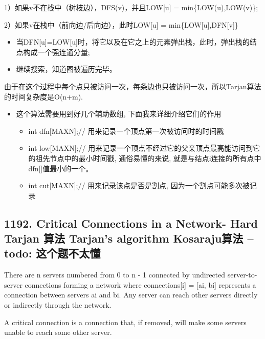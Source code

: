 \documentclass[9pt, b5paaper]{book}
\begin{document}
1）如果v不在栈中（树枝边），DFS(v)，并且LOW[u] = min\{LOW(u),LOW(v)\};

2）如果v在栈中（前向边/后向边），此时LOW[u] = min\{LOW[u],DFN[v]\}
\begin{itemize}
\item 当DFN[u]=LOW[u]时，将它以及在它之上的元素弹出栈，此时，弹出栈的结点构成一个强连通分量;
\item 继续搜索，知道图被遍历完毕。
\end{itemize}

由于在这个过程中每个点只被访问一次，每条边也只被访问一次，所以Tarjan算法的时间复杂度是O(n+m).

\begin{itemize}
\item 这个算法需要用到好几个辅助数组, 下面我来详细介绍它们的作用
\begin{itemize}
\item int dfn[MAXN];// 用来记录一个顶点第一次被访问时的时间戳
\item int low[MAXN];// 用来记录一个顶点不经过它的父亲顶点最高能访问到它的祖先节点中的最小时间戳, 通俗易懂的来说, 就是与结点i连接的所有点中dfn[]值最小的一个。
\item int cut[MAXN];// 用来记录该点是否是割点, 因为一个割点可能多次被记录
\end{itemize}
\end{itemize}

\subsection{1192. Critical Connections in a Network- Hard Tarjan 算法 Tarjan's algorithm Kosaraju算法 -- todo: 这个题不太懂}
\label{sec-1-3-2}
There are n servers numbered from 0 to n - 1 connected by undirected server-to-server connections forming a network where connections[i] = [ai, bi] represents a connection between servers ai and bi. Any server can reach other servers directly or indirectly through the network.

A critical connection is a connection that, if removed, will make some servers unable to reach some other server.
\end{document}
